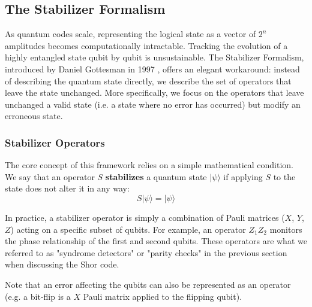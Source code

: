 \subsection{The Stabilizer Formalism}
\label{sec:stabilizer_formalism}

As quantum codes scale, representing the logical state as a vector of $2^n$ amplitudes becomes computationally intractable. Tracking the evolution of a highly entangled state qubit by qubit is unsustainable. The Stabilizer Formalism, introduced by Daniel Gottesman in 1997 \cite{gottesman1997stabilizer}, offers an elegant workaround: instead of describing the quantum state directly, we describe the set of operators that leave the state unchanged. More specifically, we focus on the operators that leave unchanged a valid state (i.e. a state where no error has occurred) but modify an erroneous state.

\subsubsection{Stabilizer Operators}

The core concept of this framework relies on a simple mathematical condition. We say that an operator $S$ \textbf{stabilizes} a quantum state $\lvert \psi \rangle$ if applying $S$ to the state does not alter it in any way:
\begin{equation}
    S \lvert \psi \rangle = \lvert \psi \rangle
\end{equation}

In practice, a stabilizer operator is simply a combination of Pauli matrices ($X$, $Y$, $Z$) acting on a specific subset of qubits. For example, an operator $Z_1 Z_2$ monitors the phase relationship of the first and second qubits. These operators are what we referred to as "syndrome detectors" or "parity checks" in the previous section when discussing the Shor code.

Note that an error affecting the qubits can also be represented as an operator (e.g. a bit-flip is a $X$ Pauli matrix applied to the flipping qubit).

